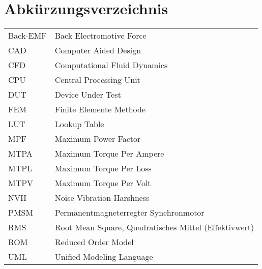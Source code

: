 \section*{Abkürzungsverzeichnis}

\begin{table}[h]
    \begin{spacing}{1.2}
        \begin{large}
            \begin{tabular}{p{3cm}l}
                Back-EMF & Back Electromotive Force\\
                CAD & Computer Aided Design\\
                CFD & Computational Fluid Dynamics\\
                CPU & Central Processing Unit\\
                DUT & Device Under Test\\
                FEM & Finite Elemente Methode\\
                LUT & Lookup Table\\
                MPF  & Maximum Power Factor\\
                MTPA & Maximum Torque Per Ampere\\ 
                MTPL & Maximum Torque Per Loss\\
                MTPV & Maximum Torque Per Volt\\
                NVH & Noise Vibration Harshness\\
                PMSM & Permanentmagneterregter Synchronmotor\\
                RMS & Root Mean Square, Quadratisches Mittel (Effektivwert)\\
                ROM & Reduced Order Model\\
                UML & Unified Modeling Language\\
            \end{tabular}
        \end{large}
    \end{spacing}
\end{table}